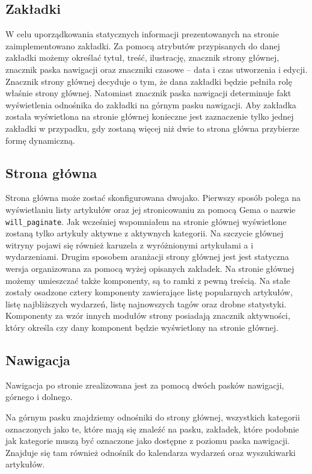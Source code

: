 \documentclass[openright]{xmgr}
\begin{document}
\newpage

\subsection{Zakładki}
W celu uporządkowania statycznych informacji prezentowanych na stronie zaimplementowano zakładki. Za pomocą atrybutów przypisanych do danej zakładki możemy określać tytuł, treść, ilustrację, znacznik strony głównej, znacznik paska nawigacji oraz znaczniki czasowe – data i czas utworzenia i edycji. Znacznik strony głównej decyduje o tym, że dana zakładki będzie pełniła rolę właśnie strony głównej. Natomiast znacznik paska nawigacji determinuje fakt wyświetlenia odnośnika do zakładki na górnym pasku nawigacji. Aby zakładka została wyświetlona na stronie głównej konieczne jest zaznaczenie tylko jednej zakładki w przypadku, gdy zostaną więcej niż dwie to strona główna przybierze formę dynamiczną.

\subsection{Strona główna}
Strona główna może zostać skonfigurowana dwojako. Pierwszy sposób polega na wyświetlaniu listy artykułów oraz jej stronicowaniu za pomocą Gema o nazwie \texttt{will\_paginate}. Jak wcześniej wspomniałem na stronie głównej wyświetlone zostaną tylko artykuły aktywne z aktywnych kategorii. Na szczycie głównej witryny pojawi się również karuzela z wyróżnionymi artykułami a i wydarzeniami. Drugim sposobem aranżacji strony głównej jest jest statyczna wersja organizowana za pomocą wyżej opisanych zakładek. Na stronie głównej możemy umieszczać także komponenty, są to ramki z pewną treścią. Na stałe zostały osadzone cztery komponenty zawierające listę popularnych artykułów, listę najbliższych wydarzeń, listę najnowszych tagów oraz drobne statystyki. Komponenty za wzór innych modułów strony posiadają znacznik aktywności, który określa czy dany komponent będzie wyświetlony na stronie głównej. 

\newpage

\subsection{Nawigacja}
Nawigacja po stronie zrealizowana jest za pomocą dwóch pasków nawigacji, górnego i dolnego. 

Na górnym pasku znajdziemy odnośniki do strony głównej, wszystkich kategorii oznaczonych jako te, które mają się znaleźć na pasku, zakładek, które podobnie jak kategorie muszą być oznaczone jako dostępne z poziomu paska nawigacji. Znajduje się tam również odnośnik do kalendarza wydarzeń oraz wyszukiwarki artykułów.
\end{document}
